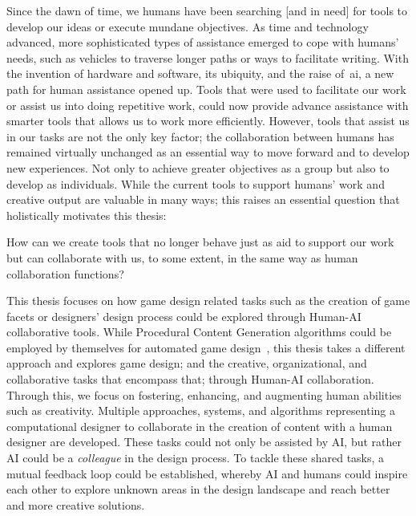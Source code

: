 Since the dawn of time, we humans have been searching [and in need] for tools to develop our ideas or execute mundane objectives. As time and technology advanced, more sophisticated types of assistance emerged to cope with humans' needs, such as vehicles to traverse longer paths or ways to facilitate writing. With the invention of hardware and software, its ubiquity, and the raise of~\acrfull{ai}, a new path for human assistance opened up. Tools that were used to facilitate our work or assist us into doing repetitive work, could now provide advance assistance with smarter tools that allows us to work more efficiently. However, tools that assist us in our tasks are not the only key factor; the collaboration between humans has remained virtually unchanged as an essential way to move forward and to develop new experiences. Not only to achieve greater objectives as a group but also to develop as individuals. While the current tools to support humans' work and creative output are valuable in many ways; this raises an essential question that holistically motivates this thesis:

\setlength{\parindent}{0.9em}

\begin{retQuestion}{}
 How can we create tools that no longer behave just as aid to support our work but can collaborate with us, to some extent, in the same way as human collaboration functions? 
\end{retQuestion}

This thesis focuses on how game design related tasks such as the creation of game facets or designers' design process could be explored through Human-AI collaborative tools. While Procedural Content Generation algorithms could be employed by themselves for automated game design~\cite{nelson_towards_2007,cook_software_2020,cook_getting_2020}, this thesis takes a different approach and explores game design; and the creative, organizational, and collaborative tasks that encompass that; through Human-AI collaboration. Through this, we focus on fostering, enhancing, and augmenting human abilities such as creativity. Multiple approaches, systems, and algorithms representing a computational designer to collaborate in the creation of content with a human designer are developed. These tasks could not only be assisted by AI, but rather AI could be a \emph{colleague} in the design process. To tackle these shared tasks, a mutual feedback loop could be established, whereby AI and humans could inspire each other to explore unknown areas in the design landscape and reach better and more creative solutions.

